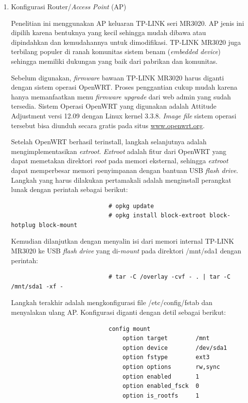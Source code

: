 			\begin{enumerate}
				\item Konfigurasi Router/\emph{Access Point} (AP)

					Penelitian ini menggunakan AP keluaran TP-LINK seri MR3020. AP jenis ini dipilih karena bentuknya yang kecil sehingga mudah dibawa atau dipindahkan dan kemudahannya untuk dimodifikasi. TP-LINK MR3020 juga terbilang populer di ranah komunitas sistem benam (\emph{embedded device}) sehingga memiliki dukungan yang baik dari pabrikan dan komunitas. 

					Sebelum digunakan, \emph{firmware} bawaan TP-LINK MR3020 harus diganti dengan sistem operasi OpenWRT. Proses penggantian cukup mudah karena hanya memanfaatkan menu \emph{firmware upgrade} dari web admin yang sudah tersedia.	Sistem Operasi OpenWRT yang digunakan adalah Attitude Adjustment versi 12.09 dengan Linux kernel 3.3.8. \emph{Image file} sistem operasi tersebut bisa diunduh secara gratis pada situs \url{www.openwrt.org}.

					Setelah OpenWRT berhasil terinstall, langkah selanjutnya adalah mengimplementasikan \emph{extroot}. \emph{Extroot} adalah fitur dari OpenWRT yang dapat memetakan direktori \emph{root} pada memori eksternal, sehingga \emph{extroot} dapat memperbesar memori penyimpanan dengan bantuan USB \emph{flash drive}. Langkah yang harus dilakukan pertamakali adalah menginstall perangkat lunak dengan perintah sebagai berikut:
					\begingroup
					    \fontsize{10pt}{12pt}\selectfont
					    \begin{verbatim}
							# opkg update
							# opkg install block-extroot block-hotplug block-mount
					    \end{verbatim}  
					\endgroup

					Kemudian dilanjutkan dengan menyalin isi dari memori internal TP-LINK MR3020 ke USB \emph{flash drive} yang di-\emph{mount} pada direktori /mnt/sda1 dengan perintah:
					\begingroup
					    \fontsize{10pt}{12pt}\selectfont
					    \begin{verbatim}
							# tar -C /overlay -cvf - . | tar -C /mnt/sda1 -xf -
					    \end{verbatim}  
					\endgroup

					Langkah terakhir adalah mengkonfigurasi file /etc/config/fstab dan menyalakan ulang AP. Konfigurasi diganti dengan detil sebagai berikut:
					\begingroup
					    \fontsize{10pt}{12pt}\selectfont
					    \begin{verbatim}
							config mount
						        option target        /mnt
						        option device        /dev/sda1
						        option fstype        ext3
						        option options       rw,sync
						        option enabled       1
						        option enabled_fsck  0
						        option is_rootfs     1
					    \end{verbatim}  
					\endgroup


\end{enumerate}
